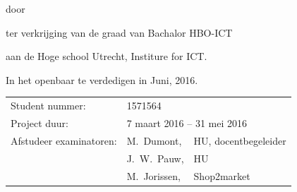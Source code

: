 \begin{titlepage}


\begin{center}


{\makeatletter
\largetitlestyle\fontsize{64}{94}\selectfont\@title
\makeatother}

{\makeatletter
\ifx\@subtitle\undefined\else
    \bigskip
   {\tudsffamily\fontsize{22}{32}\selectfont\@subtitle}    
\fi
\makeatother}

\bigskip
\bigskip

door

\bigskip
\bigskip

{\makeatletter
\largetitlestyle\fontsize{26}{26}\selectfont\@author
\makeatother}

\bigskip
\bigskip

ter verkrijging van de graad van Bachalor HBO-ICT

aan de Hoge school Utrecht, Institure for ICT.

In het openbaar te verdedigen in Juni, 2016.

\vfill

\begin{tabular}{lll}
    Student nummer: & 1571564 \\
    Project duur: & \multicolumn{2}{l}{7 maart 2016 -- 31 mei 2016} \\
    Afstudeer examinatoren:
        & M.\ Dumont, & HU, docentbegeleider \\
        & J.\ W.\ Pauw, & HU \\
        & M.\ Jorissen, & Shop2market
\end{tabular}




\end{center}


\end{titlepage}
